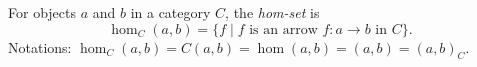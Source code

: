 For objects $a$ and $b$ in a category $C$, the \emph{hom-set} is
$$\hom_C(a, b) = \{ f \mid f \text{ is an arrow } f: a \to b \text{ in } C \}.$$
Notations: $\hom_C(a, b) = C(a, b) = \hom(a, b) = (a, b) = (a, b)_C$.
